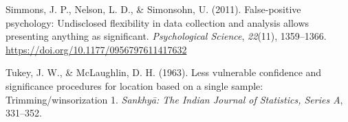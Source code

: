 \documentclass[
]{article}
\newlength{\cslhangindent}
\newlength{\cslentryspacingunit} %
\newenvironment{CSLReferences}[2] %
 {%
  \setlength{\parindent}{0pt}
  \ifodd #1
  \let\oldpar\par
  \def\par{\hangindent=\cslhangindent\oldpar}
  \fi
  \setlength{\parskip}{#2\cslentryspacingunit}
 }%
 {}
\begin{document}
\begin{CSLReferences}{1}{0}
\leavevmode{}%
Simmons, J. P., Nelson, L. D., \& Simonsohn, U. (2011). False-positive psychology: Undisclosed flexibility in data collection and analysis allows presenting anything as significant. \emph{Psychological Science}, \emph{22}(11), 1359--1366. \url{https://doi.org/10.1177/0956797611417632}

\leavevmode{}%
Tukey, J. W., \& McLaughlin, D. H. (1963). Less vulnerable confidence and significance procedures for location based on a single sample: Trimming/winsorization 1. \emph{Sankhy{ā}: The Indian Journal of Statistics, Series A}, 331--352.

\end{CSLReferences}
\end{document}
